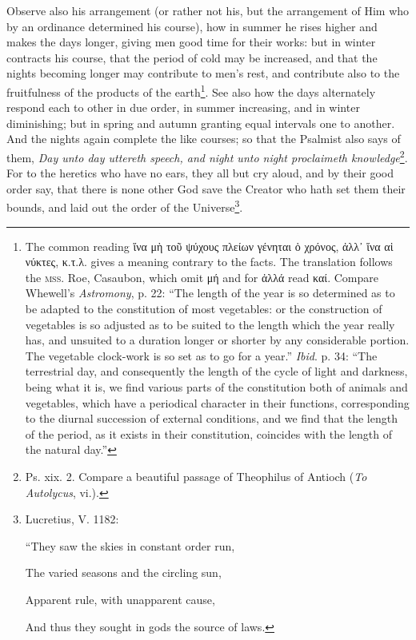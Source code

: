 Observe also his arrangement (or rather not his, but the arrangement of Him who by an ordinance determined his course), how in summer he rises higher and makes the days longer, giving men good time for their works: but in winter contracts his course, that the period of cold may be increased, and that the nights becoming longer may contribute to men’s rest, and contribute also to the fruitfulness of the products of the earth\footnote{The common reading \textgreek{ἵνα μὴ τοῦ ψύχους πλείων γένηται ὁ χρόνος, ἀλλ᾽ ἵνα αἱ νύκτες, κ.τ.λ}. gives a meaning contrary to the facts. The translation follows the \textsc{mss.} Roe, Casaubon, which omit \textgreek{μή} and for \textgreek{ἀλλά} read \textgreek{καί}. Compare Whewell’s \emph{Astromony}, p. 22: “The length of the year is so determined as to be adapted to the constitution of most vegetables: or the construction of vegetables is so adjusted as to be suited to the length which the year really has, and unsuited to a duration longer or shorter by any considerable portion. The vegetable clock-work is so set as to go for a year.” \emph{Ibid}. p. 34: “The terrestrial day, and consequently the length of the cycle of light and darkness, being what it is, we find various parts of the constitution both of animals and vegetables, which have a periodical character in their functions, corresponding to the diurnal succession of external conditions, and we find that the length of the period, as it exists in their constitution, coincides with the length of the natural day.”}. See also how the days alternately respond each to other in due order, in summer increasing, and in winter diminishing; but in spring and autumn granting equal intervals one to another. And the nights again complete the like courses; so that the Psalmist also says of them, \emph{Day unto day uttereth speech, and night unto night proclaimeth knowledge}\footnote{Ps. xix. 2. Compare a beautiful passage of Theophilus of Antioch (\emph{To Autolycus}, vi.).}. For to the heretics who have no ears, they all but cry aloud, and by their good order say, that there is none other God save the Creator who hath set them their bounds, and laid out the order of the Universe\footnote{Lucretius, V. 1182: \par “They saw the skies in constant order run, \par The varied seasons and the circling sun, \par Apparent rule, with unapparent cause, \par And thus they sought in gods the source of laws.}.

